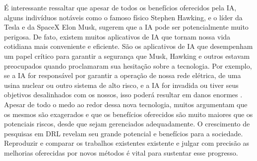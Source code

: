 É interessante ressaltar que apesar de todos os benefícios oferecidos pela IA, alguns indivíduos notáveis como o famoso físico Stephen Hawking, e o líder da Tesla e da SpaceX Elon Musk, sugerem que a IA pode ser potencialmente muito perigosa. De fato, existem muitos aplicativos de IA que tornam nossa vida cotidiana mais conveniente e eficiente. São os aplicativos de IA que desempenham um papel crítico para garantir a segurança que Musk, Hawking e outros estavam preocupados quando proclamaram sua hesitação sobre a tecnologia. Por exemplo, se a IA for responsável por garantir a operação de nossa rede elétrica, de uma usina nuclear ou outro sistema de alto risco, e a IA for invadida ou tiver seus objetivos desalinhados com os nossos, isso poderá resultar em danos enormes \cite{Marr:AI-Danger}. 
\clearpage
Apesar de todo o medo ao redor dessa nova tecnologia, muitos argumentam que os mesmos são exagerados e que os benefícios oferecidos são muito maiores que os potenciais riscos, desde que sejam gerenciados adequadamente. O crescimento de pesquisas em DRL revelam seu grande potencial e benefícios para a sociedade. Reproduzir e comparar os trabalhos existentes existente e julgar com precisão as melhorias oferecidas por novos métodos é vital para sustentar esse progresso. 




